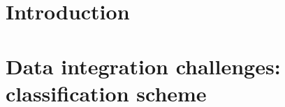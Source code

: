\documentclass{llncs}
\begin{document}
%



\section{Introduction}
\label{sec:intro}
 
 
\section{Data integration challenges: classification scheme}\label{sec:sm}



%

\end{document}
